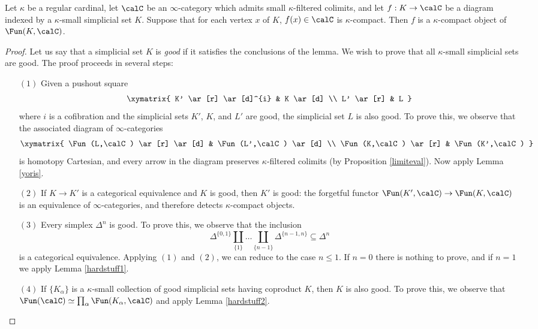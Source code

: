 \begin{proposition}\label{placeabovee}
Let $\kappa$ be a regular cardinal, let $\calC$ be an $\infty$-category which admits
small $\kappa$-filtered colimits, and let $f: K \rightarrow \calC$ be a diagram indexed by a $\kappa$-small simplicial set $K$. Suppose that for each vertex $x$ of $K$, $f(x) \in \calC$ is $\kappa$-compact. Then $f$ is a $\kappa$-compact object of $\Fun(K,\calC)$.
\end{proposition}

\begin{proof}
Let us say that a simplicial set $K$ is {\em good} if it satisfies the conclusions of the lemma.
We wish to prove that all $\kappa$-small simplicial sets are good. The proof proceeds in several steps:

\begin{itemize}
\item[$(1)$] Given a pushout square
$$ \xymatrix{ K' \ar[r] \ar[d]^{i} & K \ar[d] \\
L' \ar[r] & L }$$
where $i$ is a cofibration and the simplicial sets $K'$, $K$, and $L'$ are good, the simplicial
set $L$ is also good. To prove this, we observe that the associated diagram of $\infty$-categories
$$ \xymatrix{ \Fun(L,\calC) \ar[r] \ar[d] & \Fun(L',\calC) \ar[d] \\
\Fun(K,\calC) \ar[r] & \Fun(K',\calC) }$$ is homotopy Cartesian, and every arrow in the diagram preserves
$\kappa$-filtered colimits (by Proposition \ref{limiteval}). Now apply Lemma \ref{yoris}.

\item[$(2)$] If $K \rightarrow K'$ is a categorical equivalence and $K$ is good, then $K'$ is good:
the forgetful functor $\Fun(K',\calC) \rightarrow \Fun(K,\calC)$ is an equivalence of $\infty$-categories, and therefore detects $\kappa$-compact objects.

\item[$(3)$] Every simplex $\Delta^n$ is good. To prove this, we observe that the inclusion
$$ \Delta^{ \{0,1\} } \coprod_{ \{1\} } \ldots \coprod_{ \{n-1\} } \Delta^{ \{n-1,n\}} \subseteq \Delta^n$$
is a categorical equivalence. Applying $(1)$ and $(2)$, we can reduce to the case $n \leq 1$.
If $n=0$ there is nothing to prove, and if $n = 1$ we apply Lemma \ref{hardstuff1}.

\item[$(4)$] If $\{ K_{\alpha} \}$ is a $\kappa$-small collection of good simplicial sets having coproduct $K$, then $K$ is also good. To prove this, we observe that
$\Fun(\calC) \simeq \prod_{\alpha} \Fun(K_{\alpha}, \calC)$ and apply Lemma \ref{hardstuff2}.


\end{itemize}
\end{proof}
